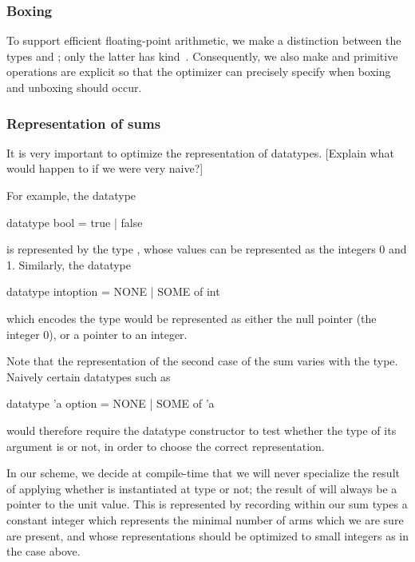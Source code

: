 \documentclass[twoside]{article}
\begin{document}
\subsubsection{Boxing}

To support efficient floating-point arithmetic, we make a distinction
between the types  and ; only the latter has
kind~.  Consequently, we also make  and  primitive
operations are explicit so that the optimizer can precisely specify
when boxing and unboxing should occur.

\subsubsection{Representation of sums}

It is very important to optimize the representation of datatypes.
[Explain what would happen to  if we were very naive?]

For example, the datatype 
\begin{code}
datatype bool = true | false
\end{code}
is represented by the type , whose values
can be represented as the integers 0 and 1.  Similarly, the datatype
\begin{code}
datatype intoption = NONE | SOME of int
\end{code}
which encodes the type  would be represented as either
the null pointer (the integer 0), or a pointer to an integer.

Note that the representation of the second case of the sum
varies with the type.  Naively certain datatypes such as 
\begin{code}
datatype 'a option = NONE | SOME of 'a 
\end{code}
would therefore require the  datatype constructor to
test whether the type of its argument is  or not, in
order to choose the correct representation.

In our scheme, we decide at compile-time that we will never specialize
the result of applying  whether  is instantiated at
type  or not; the result of  will always be a
pointer to the unit value.  This is represented by recording
within our sum types a constant integer which represents the
minimal number of  arms which we are sure are present,
and whose representations should be optimized to small integers
as in the  case above.  
\smallskip
\end{document}
